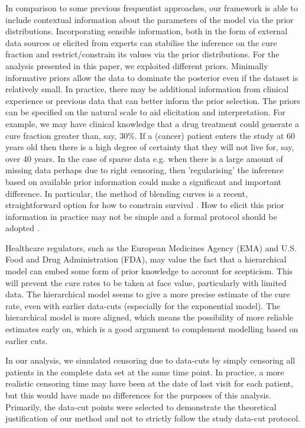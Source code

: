 \documentclass[AMA,STIX1COL]{WileyNJD-v2}
\begin{document}
In comparison to some previous frequentist approaches, our framework is able to include contextual information about the parameters of the model via the prior distributions.
Incorporating sensible information, both in the form of external data sources or elicited from experts can stabilise the inference on the cure fraction and restrict/constrain its values via the prior distributions.
For the analysis presented in this paper, we exploited different priors.
Minimally informative priors allow the data to dominate the posterior even if the dataset is relatively small.
In practice, there may be additional information from clinical experience or previous data that can better inform the prior selection.
The priors can be specified on the natural scale to aid elicitation and interpretation.
For example, we may have clinical knowledge that a drug treatment could generate a cure fraction greater than, say, 30\%.
If a (cancer) patient enters the study at 60 years old then there is a high degree of certainty that they will not live for, say, over 40 years.
In the case of sparse data e.g. when there is a large amount of missing data perhaps due to right censoring, then 'regularising' the inference based on available prior information could make a significant and important difference. In particular, the method of blending curves is a recent, straightforward option for how to constrain survival \citep{Che2022}. 
How to elicit this prior information in practice may not be simple and a formal protocol should be adopted \cite{OHagan2019}.

Healthcare regulators, such as the European Medicines Agency (EMA) and U.S. Food and Drug Administration (FDA), may value the fact that a hierarchical model can embed some form of prior knowledge to account for scepticism.
This will prevent the cure rates to be taken at face value, particularly with limited data.
The hierarchical model seems to give a more precise estimate of the cure rate, even with earlier data-cuts (especially for the exponential model).
The hierarchical model is more aligned, which means the possibility of more reliable estimates early on, which is a good argument to complement modelling based on earlier cuts.

In our analysis, we simulated censoring due to data-cuts by simply censoring all patients in the complete data set at the same time point.
In practice, a more realistic censoring time may have been at the date of last visit for each patient, but this would have made no differences for the purposes of this analysis. Primarily, the data-cut points were selected to demonstrate the theoretical justification of our method and not to strictly follow the study data-cut protocol.
\end{document}
